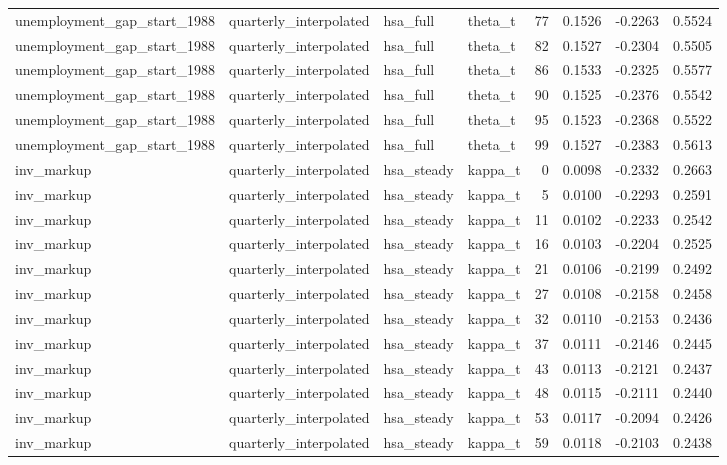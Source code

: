 \begin{tabular}{llllrrrr}
unemployment\_gap\_start\_1988 & quarterly\_interpolated & hsa\_full & theta\_t & 77 & 0.1526 & -0.2263 & 0.5524 \\
unemployment\_gap\_start\_1988 & quarterly\_interpolated & hsa\_full & theta\_t & 82 & 0.1527 & -0.2304 & 0.5505 \\
unemployment\_gap\_start\_1988 & quarterly\_interpolated & hsa\_full & theta\_t & 86 & 0.1533 & -0.2325 & 0.5577 \\
unemployment\_gap\_start\_1988 & quarterly\_interpolated & hsa\_full & theta\_t & 90 & 0.1525 & -0.2376 & 0.5542 \\
unemployment\_gap\_start\_1988 & quarterly\_interpolated & hsa\_full & theta\_t & 95 & 0.1523 & -0.2368 & 0.5522 \\
unemployment\_gap\_start\_1988 & quarterly\_interpolated & hsa\_full & theta\_t & 99 & 0.1527 & -0.2383 & 0.5613 \\
inv\_markup & quarterly\_interpolated & hsa\_steady & kappa\_t & 0 & 0.0098 & -0.2332 & 0.2663 \\
inv\_markup & quarterly\_interpolated & hsa\_steady & kappa\_t & 5 & 0.0100 & -0.2293 & 0.2591 \\
inv\_markup & quarterly\_interpolated & hsa\_steady & kappa\_t & 11 & 0.0102 & -0.2233 & 0.2542 \\
inv\_markup & quarterly\_interpolated & hsa\_steady & kappa\_t & 16 & 0.0103 & -0.2204 & 0.2525 \\
inv\_markup & quarterly\_interpolated & hsa\_steady & kappa\_t & 21 & 0.0106 & -0.2199 & 0.2492 \\
inv\_markup & quarterly\_interpolated & hsa\_steady & kappa\_t & 27 & 0.0108 & -0.2158 & 0.2458 \\
inv\_markup & quarterly\_interpolated & hsa\_steady & kappa\_t & 32 & 0.0110 & -0.2153 & 0.2436 \\
inv\_markup & quarterly\_interpolated & hsa\_steady & kappa\_t & 37 & 0.0111 & -0.2146 & 0.2445 \\
inv\_markup & quarterly\_interpolated & hsa\_steady & kappa\_t & 43 & 0.0113 & -0.2121 & 0.2437 \\
inv\_markup & quarterly\_interpolated & hsa\_steady & kappa\_t & 48 & 0.0115 & -0.2111 & 0.2440 \\
inv\_markup & quarterly\_interpolated & hsa\_steady & kappa\_t & 53 & 0.0117 & -0.2094 & 0.2426 \\
inv\_markup & quarterly\_interpolated & hsa\_steady & kappa\_t & 59 & 0.0118 & -0.2103 & 0.2438 \\

\end{tabular}
